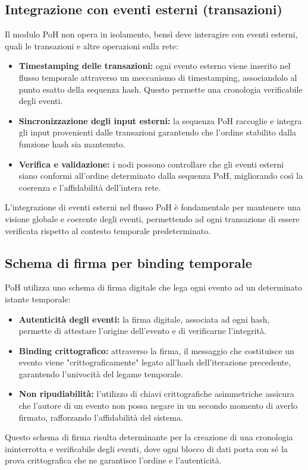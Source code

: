 \documentclass[a4paper,12pt]{report}
\begin{document}
	\subsection{Integrazione con eventi esterni (transazioni)}
	Il modulo PoH non opera in isolamento, bensì deve interagire con eventi esterni, quali le transazioni e altre operazioni sulla rete:
	\begin{itemize}
		\item \textbf{Timestamping delle transazioni:} ogni evento esterno viene inserito nel flusso temporale attraverso un meccanismo di timestamping, associandolo al punto esatto della sequenza hash. Questo permette una cronologia verificabile degli eventi.
		\item \textbf{Sincronizzazione degli input esterni:} la sequenza PoH raccoglie e integra gli input provenienti dalle transazioni garantendo che l’ordine stabilito dalla funzione hash sia mantenuto.
		\item \textbf{Verifica e validazione:} i nodi possono controllare che gli eventi esterni siano conformi all’ordine determinato dalla sequenza PoH, migliorando così la coerenza e l’affidabilità dell’intera rete.
	\end{itemize}
	L’integrazione di eventi esterni nel flusso PoH è fondamentale per mantenere una visione globale e coerente degli eventi, permettendo ad ogni transazione di essere verificata rispetto al contesto temporale predeterminato.
	
	\subsection{Schema di firma per binding temporale}
	PoH utilizza uno schema di firma digitale che lega ogni evento ad un determinato istante temporale:
	\begin{itemize}
		\item \textbf{Autenticità degli eventi:} la firma digitale, associata ad ogni hash, permette di attestare l’origine dell’evento e di verificarne l’integrità.
		\item \textbf{Binding crittografico:} attraverso la firma, il messaggio che costituisce un evento viene "crittograficamente" legato all'hash dell’iterazione precedente, garantendo l’univocità del legame temporale.
		\item \textbf{Non ripudiabilità:} l’utilizzo di chiavi crittografiche asimmetriche assicura che l’autore di un evento non possa negare in un secondo momento di averlo firmato, rafforzando l’affidabilità del sistema.
	\end{itemize}
	Questo schema di firma risulta determinante per la creazione di una cronologia ininterrotta e verificabile degli eventi, dove ogni blocco di dati porta con sé la prova crittografica che ne garantisce l’ordine e l’autenticità.
	
\end{document}

